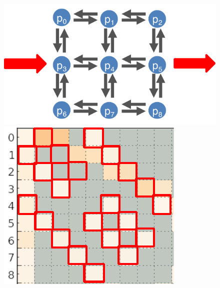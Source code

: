 \begin{figure}
\begin{minipage}[b]{0.33\linewidth}
    \end{minipage}%
    \begin{minipage}[b]{0.33\linewidth}
        \centering
        \includegraphics[width=\linewidth]{chapter_4_figures/comm_pattern_n2n}
    \end{minipage}%
    \begin{minipage}[b]{0.33\linewidth}
        \centering
        \includegraphics[width=0.9\linewidth]{chapter_4_figures/partial_heatmap_out_of_order_n2n}
    \end{minipage}
    \\
    \begin{minipage}[b]{0.33\linewidth}
        \centering

\end{minipage}
\end{figure}
